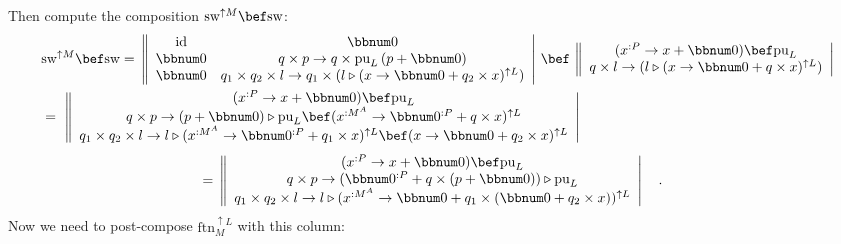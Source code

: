 Then compute the composition $\text{sw}^{\uparrow M}\bef\text{sw}$:
\begin{align*}
 & \text{sw}^{\uparrow M}\bef\text{sw}=\,\left\Vert \begin{array}{cc}
\text{id} & \bbnum 0\\
\bbnum 0 & q\times p\rightarrow q\times\text{pu}_{L}\left(p+\bbnum 0\right)\\
\bbnum 0 & q_{1}\times q_{2}\times l\rightarrow q_{1}\times(l\triangleright(x\rightarrow\bbnum 0+q_{2}\times x)^{\uparrow L})
\end{array}\right|\,\bef\,\left\Vert \begin{array}{c}
(x^{:P}\rightarrow x+\bbnum 0)\bef\text{pu}_{L}\\
q\times l\rightarrow(l\triangleright(x\rightarrow\bbnum 0+q\times x)^{\uparrow L})
\end{array}\right|\\
 & =\,\,\left\Vert \begin{array}{c}
(x^{:P}\rightarrow x+\bbnum 0)\bef\text{pu}_{L}\\
q\times p\rightarrow\left(p+\bbnum 0\right)\triangleright\text{pu}_{L}\bef(x^{:M^{A}}\rightarrow\bbnum 0^{:P}+q\times x)^{\uparrow L}\\
q_{1}\times q_{2}\times l\rightarrow l\triangleright(x^{:M^{A}}\rightarrow\bbnum 0^{:P}+q_{1}\times x)^{\uparrow L}\bef(x\rightarrow\bbnum 0+q_{2}\times x)^{\uparrow L}
\end{array}\right|
\end{align*}
\begin{align*}
 & =\,\left\Vert \begin{array}{c}
(x^{:P}\rightarrow x+\bbnum 0)\bef\text{pu}_{L}\\
q\times p\rightarrow(\bbnum 0^{:P}+q\times\left(p+\bbnum 0\right))\triangleright\text{pu}_{L}\\
q_{1}\times q_{2}\times l\rightarrow l\triangleright(x^{:M^{A}}\rightarrow\bbnum 0+q_{1}\times(\bbnum 0+q_{2}\times x))^{\uparrow L}
\end{array}\right|\quad.
\end{align*}
Now we need to post-compose $\text{ftn}_{M}^{\uparrow L}$ with this
column:
